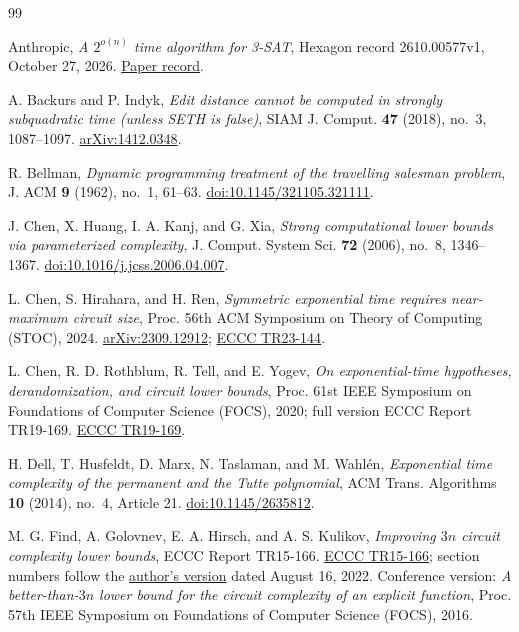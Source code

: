 \documentclass[11pt,reqno]{amsart}
\numberwithin{equation}{section}
\theoremstyle{plain}
\theoremstyle{definition}
\theoremstyle{remark}
\begin{document}
\begin{thebibliography}{99}
\raggedright
{}
Anthropic, \emph{A $2^{o(n)}$ time algorithm for 3-SAT}, Hexagon record
2610.00577v1, October 27, 2026.
\href{https://hexagonmath.org/2610.00577v1}{Paper record}.

A. Backurs and P. Indyk, \emph{Edit distance cannot be computed in strongly
subquadratic time (unless SETH is false)}, SIAM J. Comput. \textbf{47}
(2018), no.~3, 1087--1097.
\href{https://arxiv.org/abs/1412.0348}{arXiv:1412.0348}.

R. Bellman, \emph{Dynamic programming treatment of the travelling salesman
problem}, J. ACM \textbf{9} (1962), no.~1, 61--63.
\href{https://doi.org/10.1145/321105.321111}{doi:10.1145/321105.321111}.

J. Chen, X. Huang, I. A. Kanj, and G. Xia, \emph{Strong computational lower
bounds via parameterized complexity}, J. Comput. System Sci. \textbf{72}
(2006), no.~8, 1346--1367.
\href{https://doi.org/10.1016/j.jcss.2006.04.007}{doi:10.1016/j.jcss.2006.04.007}.

L. Chen, S. Hirahara, and H. Ren, \emph{Symmetric exponential time requires
near-maximum circuit size}, Proc. 56th ACM Symposium on Theory of Computing
(STOC), 2024.
\href{https://arxiv.org/abs/2309.12912}{arXiv:2309.12912};
\href{https://eccc.weizmann.ac.il/report/2023/144/}{ECCC TR23-144}.

L. Chen, R. D. Rothblum, R. Tell, and E. Yogev, \emph{On exponential-time
hypotheses, derandomization, and circuit lower bounds}, Proc. 61st IEEE
Symposium on Foundations of Computer Science (FOCS), 2020; full version ECCC
Report TR19-169.
\href{https://eccc.weizmann.ac.il/report/2019/169/}{ECCC TR19-169}.

H. Dell, T. Husfeldt, D. Marx, N. Taslaman, and M. Wahl\'en,
\emph{Exponential time complexity of the permanent and the Tutte
polynomial}, ACM Trans. Algorithms \textbf{10} (2014), no.~4, Article 21.
\href{https://doi.org/10.1145/2635812}{doi:10.1145/2635812}.

M. G. Find, A. Golovnev, E. A. Hirsch, and A. S. Kulikov,
\emph{Improving $3n$ circuit complexity lower bounds}, ECCC Report
TR15-166.
\href{https://eccc.weizmann.ac.il/report/2015/166/}{ECCC TR15-166};
section numbers follow the
\href{https://edwardahirsch.github.io/edwardahirsch/papers/386.pdf}{author's
version} dated August 16, 2022. Conference version: \emph{A better-than-$3n$
lower bound for the circuit complexity of an explicit function}, Proc. 57th
IEEE Symposium on Foundations of Computer Science (FOCS), 2016.


\end{thebibliography}
\end{document}
